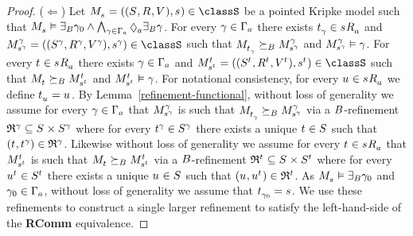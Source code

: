 \begin{proof}
($\Leftarrow$)
Let $\kPModelAndTuple{\kStateS} \in \classS$ be a pointed Kripke model such that $\kPModel{\kStateS} \entails \somerefsBs \gamma_0 \land \bigwedge_{\gamma \in \Gamma_\agentA} \possibleA \somerefsBs \gamma$.
For every $\gamma \in \Gamma_\agentA$ there exists $\kStateT_\gamma \in \kSuccessorsA{\kStateS}$ and $\kPModelAndTuple[\gamma]{\kStateS[\gamma]} \in \classS$ such that $\kPModel{\kStateT_\gamma} \simulatesBs \kPModel[\gamma]{\kStateS[\gamma]}$ and $\kPModel[\gamma]{\kStateS[\gamma]} \entails \gamma$.
For every $\kStateT \in \kSuccessorsA{\kStateS}$ there exists $\gamma \in \Gamma_\agentA$ and $\kPModelAndTuple[\kStateT]{\kStateS[\kStateT]} \in \classS$ such that $\kPModel{\kStateT} \simulatesBs \kPModel[\kStateT]{\kStateS[\kStateT]}$ and $\kPModel[\kStateT]{\kStateS[\kStateT]} \entails \gamma$.
For notational consistency, for every $\kStateU \in \kSuccessorsA{\kStateS}$ we define $\kStateT_{\kStateU} = \kStateU$.
By Lemma~\ref{refinement-functional}, without loss of generality we assume for every $\gamma \in \Gamma_\agentA$ that $\kPModel[\gamma]{\kStateS[\gamma]}$ is such that $\kPModel{\kStateT_\gamma} \simulatesBs \kPModel[\gamma]{\kStateS[\gamma]}$ via a $\agentsB$-refinement $\refinement^{\gamma} \subseteq \kStates \times \kStates[\gamma]$ where for every $\kStateT[\gamma] \in \kStates[\gamma]$ there exists a unique $\kStateT \in \kStates$ such that $(\kStateT, \kStateT[\gamma]) \in \refinement^{\gamma}$.
Likewise without loss of generality we assume for every $\kStateT \in \kSuccessorsA{\kStateS}$ that $\kPModel[\kStateT]{\kStateS[\kStateT]}$ is such that $\kPModel{\kStateT} \simulatesBs \kPModel[\kStateT]{\kStateS[\kStateT]}$ via a $\agentsB$-refinement $\refinement^{\kStateT} \subseteq \kStates \times \kStates[\kStateT]$ where for every $\kStateU[\kStateT] \in \kStates[\kStateT]$ there exists a unique $\kStateU \in \kStates$ such that $(\kStateU, \kStateU[\kStateT]) \in \refinement^{\kStateT}$.
As $\kPModel{\kStateS} \entails \somerefsBs \gamma_0$ and $\gamma_0 \in \Gamma_\agentA$, without loss of generality we assume that $\kStateT_{\gamma_0} = \kStateS$.
We use these refinements to construct a single larger refinement to satisfy the left-hand-side of the {\bf RComm} equivalence.


\end{proof}
